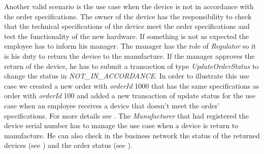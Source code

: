 Another valid scenario is the use case when the device is not in accordance with the order specifications. The owner of the device has the responsibility
to check that the technical specifications of the device meet the order specifications and test the functionality of the new hardware.
If something is not as expected the employee has to inform his manager. The manager has the role of \emph{Regulator} so it is his duty to return the device
to the manufacture. If the manager approves the return of the device, he has to submit a transaction of type \emph{UpdateOrderStatus} to change the status in \emph{NOT_IN_ACCORDANCE}.
In order to illustrate this use case we created a new order with \emph{orderId} 1000 that has the same specifications as order with \emph{orderId} 100 and added a new transaction of update status for the use case when an employee receives a device that doesn't meet the order' specifications. For more details see .
The \emph{Manufacturer} that had registered the device serial number has to manage the use case when a device is return to manufacture. He can also check in the business network the status of the returned devices (see ) and the order status (see ). 
 






